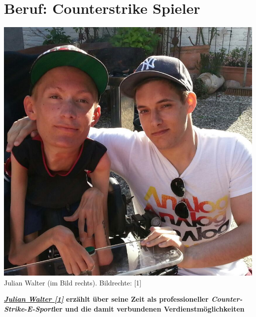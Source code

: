 \section*{Beruf: Counterstrike Spieler}
\label{counterstrike}
\begin{center}
\includegraphics[width=\linewidth]{counterstrike/julian_walter.jpg} \\
\footnotesize{Julian Walter (im Bild rechts). Bildrechte: [1]}
\end{center}

\textbf{\href{https://plus.google.com/108488461844417773815/about}{\textit{Julian Walter [1]}} erzählt über seine Zeit als professioneller \textit{Counter-Strike}-\textit{E-Sport}ler und die damit verbundenen Verdienstmöglichkeiten} 



